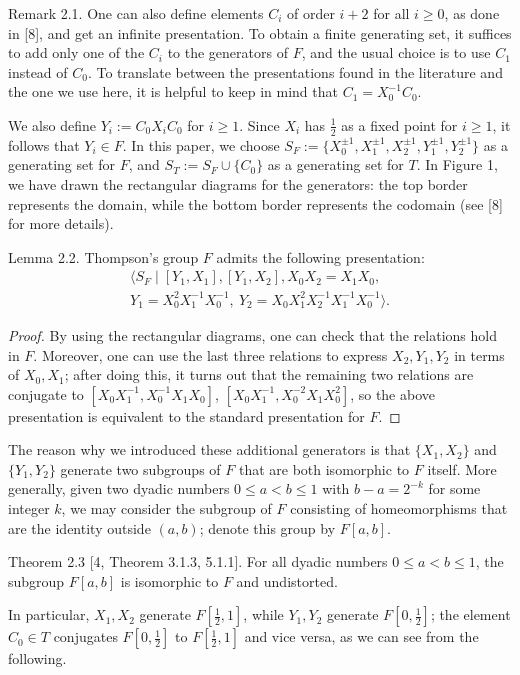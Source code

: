 \begin{authorremark}{Remark 2.1.}
One can also define elements $C_i$ of order $i+2$ for all $i\ge0$, as done in [8], and get an infinite presentation. To obtain a finite generating set, it suffices to add only one of the $C_i$ to the generators of $F$, and the usual choice is to use $C_1$ instead of $C_0$. To translate between the presentations found in the literature and the one we use here, it is helpful to keep in mind that $C_1=X_0^{-1}C_0$.
\end{authorremark}
We also define $Y_i:=C_0X_iC_0$ for $i\ge1$. Since $X_i$ has $\frac12$ as a fixed point for $i\ge1$, it follows that $Y_i\in F$. In this paper, we choose $S_F:=\{X_0^{\pm1},X_1^{\pm1},X_2^{\pm1},Y_1^{\pm1},Y_2^{\pm1}\}$ as a generating set for $F$, and $S_T:=S_F\cup\{C_0\}$ as a generating set for $T$. In Figure 1, we have drawn the rectangular diagrams for the generators: the top border represents the domain, while the bottom border represents the codomain (see [8] for more details).

\begin{authorstatement}{Lemma 2.2.}
Thompson's group $F$ admits the following presentation:
\[
\begin{gathered}
\langle S_F\mid [Y_1,X_1], [Y_1,X_2], X_0X_2=X_1X_0,\\
Y_1=X_0^2X_1^{-1}X_0^{-1},\ Y_2=X_0X_1^2X_2^{-1}X_1^{-1}X_0^{-1}\rangle.
\end{gathered}
\]
\end{authorstatement}
\begin{proof}
By using the rectangular diagrams, one can check that the relations hold in $F$. Moreover, one can use the last three relations to express $X_2,Y_1,Y_2$ in terms of $X_0,X_1$; after doing this, it turns out that the remaining two relations are conjugate to $[X_0X_1^{-1},X_0^{-1}X_1X_0]$, $[X_0X_1^{-1},X_0^{-2}X_1X_0^2]$, so the above presentation is equivalent to the standard presentation for $F$.
\end{proof}
The reason why we introduced these additional generators is that $\{X_1,X_2\}$ and $\{Y_1,Y_2\}$ generate two subgroups of $F$ that are both isomorphic to $F$ itself. More generally, given two dyadic numbers $0\le a<b\le1$ with $b-a=2^{-k}$ for some integer $k$, we may consider the subgroup of $F$ consisting of homeomorphisms that are the identity outside $(a,b)$; denote this group by $F[a,b]$.

\begin{authorstatement}{Theorem 2.3 [4, Theorem 3.1.3, 5.1.1].}
For all dyadic numbers $0\le a<b\le1$, the subgroup $F[a,b]$ is isomorphic to $F$ and undistorted.
\end{authorstatement}
In particular, $X_1,X_2$ generate $F[\frac12,1]$, while $Y_1,Y_2$ generate $F[0,\frac12]$; the element $C_0\in T$ conjugates $F[0,\frac12]$ to $F[\frac12,1]$ and vice versa, as we can see from the following.


